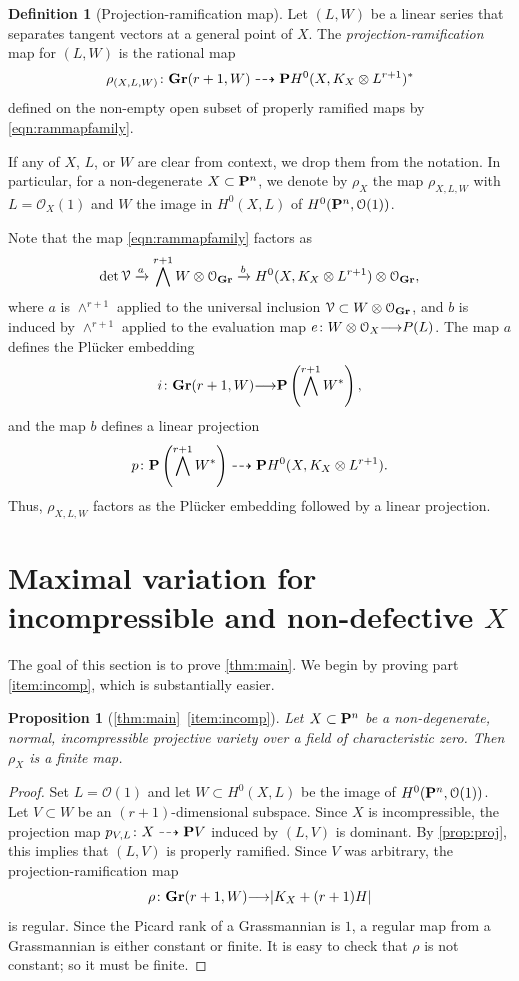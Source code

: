 \documentclass[11pt,reqno]{amsart}
\theoremstyle{plain}
\newtheorem{proposition}[theorem]{Proposition}
\theoremstyle{definition}
\newtheorem{definition}[theorem]{Definition}
\theoremstyle{remark}
\numberwithin{equation}{section}
\renewcommand{\to}{{\longrightarrow}}
\numberwithin{equation}{section}
\renewcommand{\O}{\mathcal O}
\begin{document}
\begin{definition}[Projection-ramification map]
  \label{def:ProjectionRamification}
  Let $(L, W)$ be a linear series that separates tangent vectors at a general point of $X$.
  The \emph{projection-ramification} map for $(L,W)$ is the rational map
  \[
    \rho_{(X,L,W)} \from \Gr(r+1, W) \dashrightarrow \P H^0(X, K_X \otimes L^{r+1})^*
  \]
  defined on the non-empty open subset of properly ramified maps by \eqref{eqn:rammapfamily}.
\end{definition}
If any of $X$, $L$, or $W$ are clear from context, we drop them from the notation.
In particular, for a non-degenerate $X \subset \P^n$, we denote by $\rho_X$ the map $\rho_{X,L,W}$  with $L = \O_X(1)$ and $W$ the image in $H^0(X, L)$ of $H^0(\P^n, \O(1))$.

Note that the map \eqref{eqn:rammapfamily} factors as
\[ \det \mathcal V \xrightarrow{a} \bigwedge^{r+1} W \otimes \O_{\Gr} \xrightarrow{b} H^0(X, K_X \otimes L^{r+1}) \otimes \O_{\Gr},\]
where $a$ is $\wedge^{r+1}$ applied to the universal inclusion $\mathcal V \subset W \otimes \O_{\Gr}$, and $b$ is induced by $\wedge^{r+1}$ applied to the evaluation map $e \from W \otimes \O_{X} \to P(L)$.
The map $a$ defines the Pl\"ucker embedding
\[ i \from \Gr(r+1, W) \to \P \left(\bigwedge^{r+1}W^*\right),\]
and the map $b$ defines a linear projection
\[ p \from \P \left(\bigwedge^{r+1}W^*\right) \dashrightarrow \P H^0(X, K_X \otimes L^{r+1}).\]
Thus, $\rho_{X,L,W}$ factors as the Pl\"ucker embedding followed by a linear projection.

\section{Maximal variation for incompressible and non-defective $X$}
\label{sec:proof_of_theorem:main}
The goal of this section is to prove \autoref{thm:main}.
We begin by proving part \eqref{item:incomp}, which is substantially easier.
\begin{proposition}[\autoref{thm:main}~\eqref{item:incomp}]
  \label{prop:incompress}
  Let $X \subset \P^n$ be a non-degenerate, normal, incompressible projective variety over a field of characteristic zero.
  Then $\rho_X$ is a finite map.
\end{proposition}
\begin{proof}
  Set $L = \O(1)$ and let $W \subset H^0(X, L)$ be the image of $H^0(\P^n, \O(1))$.
  Let $V \subset W$ be an $(r+1)$-dimensional subspace.
  Since $X$ is incompressible, the projection map $p_{V,L} \from X \dashrightarrow \P V$ induced by $(L, V)$ is dominant.
  By \autoref{prop:proj}, this implies that $(L, V)$ is properly ramified.
  Since $V$ was arbitrary, the projection-ramification map 
  \[ \rho \from \Gr(r+1, W) \to |K_X + (r+1) H|\]
  is regular.
  Since the Picard rank of a Grassmannian is $1$, a regular map from a Grassmannian is either constant or finite.
  It is easy to check that $\rho$ is not constant; so it must be finite.
\end{proof}
\end{document}
